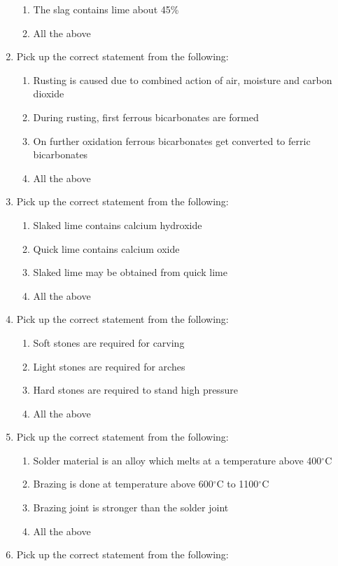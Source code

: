\documentclass[11pt,a4paper]{article}
\begin{document}
\begin{enumerate}
\begin{enumerate}[label=\Alph*.]
\item{The slag contains lime about 45\%}
\item{All the above}
\end{enumerate}
\item{Pick up the correct statement from the following:}
\begin{enumerate}[label=\Alph*.]
\item{Rusting is caused due to combined action of air, moisture and carbon dioxide}
\item{During rusting, first ferrous bicarbonates are formed}
\item{On further oxidation ferrous bicarbonates get converted to ferric bicarbonates}
\item{All the above}
\end{enumerate}
\item{Pick up the correct statement from the following:}
\begin{enumerate}[label=\Alph*.]
\item{Slaked lime contains calcium hydroxide}
\item{Quick lime contains calcium oxide}
\item{Slaked lime may be obtained from quick lime}
\item{All the above}
\end{enumerate}
\item{Pick up the correct statement from the following:}
\begin{enumerate}[label=\Alph*.]
\item{Soft stones are required for carving}
\item{Light stones are required for arches}
\item{Hard stones are required to stand high pressure}
\item{All the above}
\end{enumerate}
\item{Pick up the correct statement from the following:}
\begin{enumerate}[label=\Alph*.]
\item{Solder material is an alloy which melts at a temperature above 400$^\circ$C}
\item{Brazing is done at temperature above 600$^\circ$C to 1100$^\circ$C}
\item{Brazing joint is stronger than the solder joint}
\item{All the above}
\end{enumerate}
\item{Pick up the correct statement from the following:}

\end{enumerate}
\end{document}
